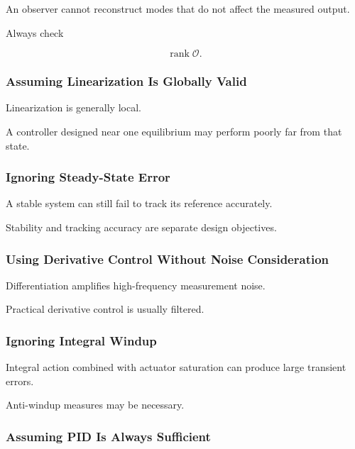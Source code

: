 An observer cannot reconstruct modes that do not affect the measured output.

Always check

\[
\operatorname{rank}\mathcal{O}.
\]

\subsubsection{Assuming Linearization Is Globally Valid}

Linearization is generally local.

A controller designed near one equilibrium may perform poorly far from that
state.

\subsubsection{Ignoring Steady-State Error}

A stable system can still fail to track its reference accurately.

Stability and tracking accuracy are separate design objectives.

\subsubsection{Using Derivative Control Without Noise Consideration}

Differentiation amplifies high-frequency measurement noise.

Practical derivative control is usually filtered.

\subsubsection{Ignoring Integral Windup}

Integral action combined with actuator saturation can produce large transient
errors.

Anti-windup measures may be necessary.

\subsubsection{Assuming PID Is Always Sufficient}

